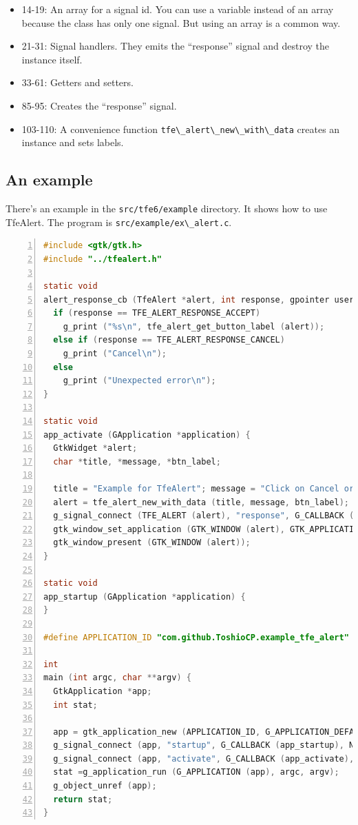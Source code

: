 \begin{itemize}
\tightlist
\item
  14-19: An array for a signal id. You can use a variable instead of an
  array because the class has only one signal. But using an array is a
  common way.
\item
  21-31: Signal handlers. They emits the ``response'' signal and destroy
  the instance itself.
\item
  33-61: Getters and setters.
\item
  85-95: Creates the ``response'' signal.
\item
  103-110: A convenience function
  \passthrough{\lstinline!tfe\_alert\_new\_with\_data!} creates an
  instance and sets labels.
\end{itemize}

\subsection{An example}\label{an-example}

There's an example in the \passthrough{\lstinline!src/tfe6/example!}
directory. It shows how to use TfeAlert. The program is
\passthrough{\lstinline!src/example/ex\_alert.c!}.

\begin{lstlisting}[language=C, numbers=left]
#include <gtk/gtk.h>
#include "../tfealert.h"

static void
alert_response_cb (TfeAlert *alert, int response, gpointer user_data) {
  if (response == TFE_ALERT_RESPONSE_ACCEPT)
    g_print ("%s\n", tfe_alert_get_button_label (alert));
  else if (response == TFE_ALERT_RESPONSE_CANCEL)
    g_print ("Cancel\n");
  else
    g_print ("Unexpected error\n");
}

static void
app_activate (GApplication *application) {
  GtkWidget *alert;
  char *title, *message, *btn_label;

  title = "Example for TfeAlert"; message = "Click on Cancel or Accept button"; btn_label = "Accept";
  alert = tfe_alert_new_with_data (title, message, btn_label);
  g_signal_connect (TFE_ALERT (alert), "response", G_CALLBACK (alert_response_cb), NULL);
  gtk_window_set_application (GTK_WINDOW (alert), GTK_APPLICATION (application));
  gtk_window_present (GTK_WINDOW (alert));
}

static void
app_startup (GApplication *application) {
}

#define APPLICATION_ID "com.github.ToshioCP.example_tfe_alert"

int
main (int argc, char **argv) {
  GtkApplication *app;
  int stat;

  app = gtk_application_new (APPLICATION_ID, G_APPLICATION_DEFAULT_FLAGS);
  g_signal_connect (app, "startup", G_CALLBACK (app_startup), NULL);
  g_signal_connect (app, "activate", G_CALLBACK (app_activate), NULL);
  stat =g_application_run (G_APPLICATION (app), argc, argv);
  g_object_unref (app);
  return stat;
}
\end{lstlisting}

